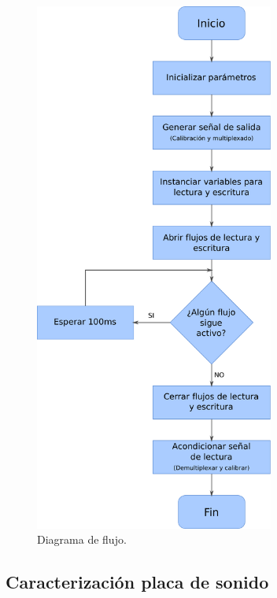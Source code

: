 \documentclass[a4paper,11pt]{article}
\begin{document}
    \begin{figure}[!h] 
        \centering
        \includegraphics[width=0.7\textwidth]{imagenes/flowchart.pdf}
        \caption{Diagrama de flujo.
        }
        \label{fig:flowchart}
 
    \end{figure}
    \clearpage
	
	\subsection{Caracterización placa de sonido}
	\label{sec:caracterizacion}
\end{document}
